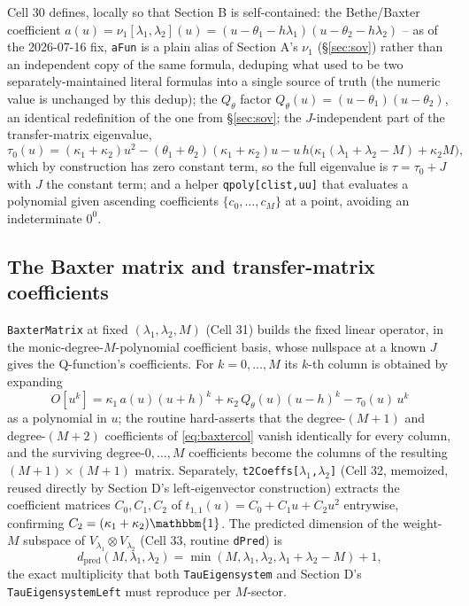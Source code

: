 \documentclass[11pt]{article}
\newcommand{\qth}{Q_\theta}
\begin{document}
Cell 30 defines, locally so that Section B is self-contained: the Bethe/Baxter coefficient
$a(u) = \nu_1[\lambda_1,\lambda_2](u) = (u-\theta_1-h\lambda_1)(u-\theta_2-h\lambda_2)$ -- as of the
2026-07-16 fix, \texttt{aFun} is a plain alias of Section A's $\nu_1$ (\S\ref{sec:sov}) rather than
an independent copy of the same formula, deduping what used to be two separately-maintained literal
formulas into a single source of truth (the numeric value is unchanged by this dedup); the $\qth$
factor $\qth(u)=(u-\theta_1)(u-\theta_2)$, an identical redefinition of the one from
\S\ref{sec:sov}; the $J$-independent part of the transfer-matrix eigenvalue,
\[
  \tau_0(u) = (\kappa_1+\kappa_2)u^2 - (\theta_1+\theta_2)(\kappa_1+\kappa_2)u
    - u\,h\bigl(\kappa_1(\lambda_1+\lambda_2-M)+\kappa_2 M\bigr),
\]
which by construction has zero constant term, so the full eigenvalue is $\tau=\tau_0+J$ with $J$ the
constant term; and a helper \texttt{qpoly[clist,uu]} that evaluates a polynomial given ascending
coefficients $\{c_0,\dots,c_M\}$ at a point, avoiding an indeterminate $0^0$.

\subsection*{The Baxter matrix and transfer-matrix coefficients}

\texttt{BaxterMatrix} at fixed $(\lambda_1,\lambda_2,M)$ (Cell 31) builds the fixed linear operator,
in the monic-degree-$M$-polynomial coefficient basis, whose nullspace at a known $J$ gives the
Q-function's coefficients. For $k=0,\dots,M$ its $k$-th column is obtained by expanding
\begin{equation}
  O[u^k] = \kappa_1\,a(u)(u+h)^k + \kappa_2\,\qth(u)(u-h)^k - \tau_0(u)\,u^k
  \label{eq:baxtercol}
\end{equation}
as a polynomial in $u$; the routine hard-asserts that the degree-$(M{+}1)$ and degree-$(M{+}2)$
coefficients of \eqref{eq:baxtercol} vanish identically for every column, and the surviving
degree-$0,\dots,M$ coefficients become the columns of the resulting $(M{+}1)\times(M{+}1)$ matrix.
Separately, \texttt{t2Coeffs[$\lambda_1$,$\lambda_2$]} (Cell 32, memoized, reused directly by
Section D's left-eigenvector construction) extracts the coefficient matrices $C_0,C_1,C_2$ of
$t_{1,1}(u) = C_0 + C_1 u + C_2 u^2$ entrywise, confirming $C_2=(\kappa_1+\kappa_2)\mathbbm{1}$. The
predicted dimension of the weight-$M$ subspace of $V_{\lambda_1}\otimes V_{\lambda_2}$ (Cell 33,
routine \texttt{dPred}) is
\[
  d_{\mathrm{pred}}(M,\lambda_1,\lambda_2) = \min(M,\lambda_1,\lambda_2,\lambda_1+\lambda_2-M) + 1,
\]
the exact multiplicity that both \texttt{TauEigensystem} and Section D's \texttt{TauEigensystemLeft}
must reproduce per $M$-sector.
\end{document}
